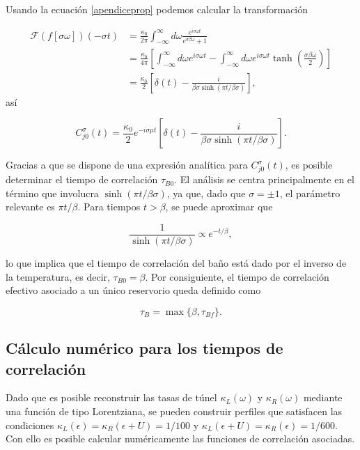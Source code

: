 \begin{appendixs}
Usando la ecuación \eqref{apendiceprop} podemos calcular la transformación

\begin{align*}
    \mathcal{F}(f[\sigma \omega])(-\sigma t) &= \frac{\kappa_{0}}{2\pi} \int_{-\infty}^{\infty} d\omega \frac{e^{i\sigma \omega t}}{e^{\sigma \beta \omega} +1 } \\
        & = \frac{\kappa_{0}}{4\pi} \left[\int_{-\infty}^{\infty}d \omega e^{i\sigma \omega t} - \int_{-\infty}^{\infty}d\omega e^{i\sigma \omega t} \tanh \left(\frac{ \sigma \beta \omega }{2} \right)   \right] \\
        & =  \frac{\kappa_{0}}{2} \left[\delta(t) - \frac{i}{\beta \sigma \sinh(\pi t/\beta \sigma)} \right],
\end{align*}
así

\begin{equation*}
    C^{\sigma}_{j0}(t) = \frac{\kappa_{0}}{2}e^{-i\sigma \mu t} \left[\delta(t) - \frac{i}{\beta \sigma \sinh(\pi t/\beta \sigma)} \right].
\end{equation*}

Gracias a que se dispone de una expresión analítica para $C^{\sigma}_{j0}(t)$, es posible determinar el tiempo de correlación $\tau_{B0}$. El análisis se centra principalmente en el término que involucra $\sinh(\pi t/\beta \sigma)$, ya que, dado que $\sigma = \pm 1$, el parámetro relevante es $\pi t/\beta$. Para tiempos $t > \beta$, se puede aproximar que 

\[
\frac{1}{\sinh(\pi t/\beta \sigma)} \propto e^{-t/\beta},
\]

lo que implica que el tiempo de correlación del baño está dado por el inverso de la temperatura, es decir, $\tau_{B0} = \beta$. Por consiguiente, el tiempo de correlación efectivo asociado a un único reservorio queda definido como

\[
\tau_{B} = \max \{\beta, \tau_{Bf}\}.
\]

\label{appendix5correlation}

\subsection{Cálculo numérico para los tiempos de correlación}
\label{appendix5tauf}
Dado que es posible reconstruir las tasas de túnel $\kappa_{L}(\omega)$ y $\kappa_{R}(\omega)$ mediante una función de tipo Lorentziana, se pueden construir perfiles que satisfacen las condiciones $\kappa_{L}(\epsilon) = \kappa_{R}(\epsilon+U) = 1/100$ y $\kappa_{L}(\epsilon+U) = \kappa_{R}(\epsilon) = 1/600$. Con ello es posible calcular numéricamente las funciones de correlación asociadas.  


\end{appendixs}
